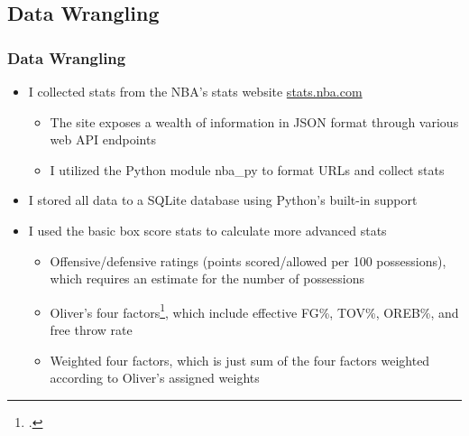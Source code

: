 \documentclass{beamer}
\begin{document}
\subsection{Data Wrangling}
\begin{frame}
\frametitle{Data Wrangling}
\begin{itemize}
    \item I collected stats from the NBA's stats website \url{stats.nba.com}
    \begin{itemize}
        \item The site exposes a wealth of information in JSON format through various web API endpoints
        \item I utilized the Python module nba\_py to format URLs and collect stats
    \end{itemize}
    \item I stored all data to a SQLite database using Python's built-in support
    \item I used the basic box score stats to calculate more advanced stats
    \begin{itemize}
        \item Offensive/defensive ratings (points scored/allowed per 100 possessions), which requires an estimate for the number of possessions
        \item Oliver's four factors\footcite{oliver}, which include effective FG\%, TOV\%, OREB\%, and free throw rate
        \item Weighted four factors, which is just sum of the four factors weighted according to Oliver's assigned weights
    \end{itemize}
\end{itemize}
\end{frame}
\end{document}
